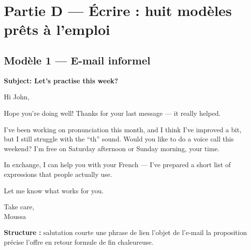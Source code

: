 \section{Partie D --- Écrire : huit modèles prêts à l'emploi}

\subsection{Modèle 1 --- E-mail informel}
\begin{dialoguebox}
\begin{anglais}
\textbf{Subject: Let's practise this week?}

Hi John,

Hope you're doing well! Thanks for your last message --- it really helped.

I've been working on pronunciation this month, and I think I've improved a bit, but I still
struggle with the ``th'' sound. Would you like to do a voice call this weekend? I'm free on
Saturday afternoon or Sunday morning, your time.

In exchange, I can help you with your French --- I've prepared a short list of expressions
that people actually use.

Let me know what works for you.

Take care,\\
Moussa
\end{anglais}
\end{dialoguebox}
\textbf{Structure :} salutation courte \ra une phrase de lien \ra l'objet de l'e-mail
\ra la proposition précise \ra l'offre en retour \ra formule de fin chaleureuse.

